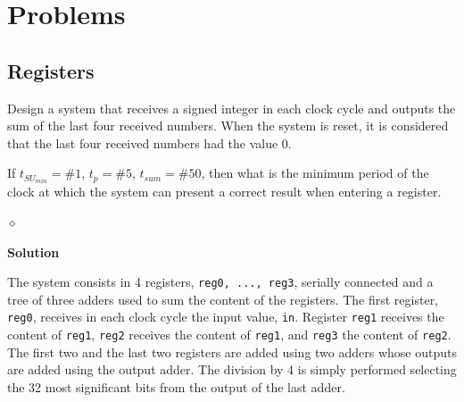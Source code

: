 \section{Problems}
\subsection{Registers}

\begin{problem}\label{mean}
Design a system that receives a signed integer in each clock cycle and outputs the sum of the last four received numbers. When the system is reset, it is considered that the last four received numbers had the value 0.

If $t_{SU_{min}} = \#1$, $t_p = \#5$, $t_{sum} = \#50$, then what is the minimum period of the clock at which the system can present a correct result when entering a register.

$\diamond$
\end{problem}

{\bf Solution}

The system consists in 4 registers, {\tt reg0, ..., reg3}, serially connected and a tree of three adders used to sum the content of the registers. The first register, {\tt reg0}, receives in each clock cycle the input value, {\tt in}. Register {\tt reg1} receives the content of {\tt reg1}, {\tt reg2} receives the content of {\tt reg1}, and {\tt reg3} the content of {\tt reg2}. The first two and the last two registers are added using two adders whose outputs are added using the output adder. The division by 4 is simply performed selecting the 32 most significant bits from the output of the last adder.






